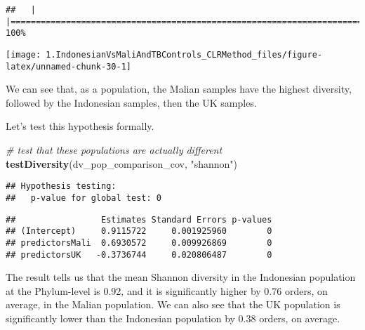 \documentclass[]{article}
\newenvironment{Shaded}{\begin{snugshade}}{\end{snugshade}}
\newcommand{\CommentTok}[1]{\textcolor[rgb]{0.56,0.35,0.01}{\textit{#1}}}
\newcommand{\DataTypeTok}[1]{\textcolor[rgb]{0.13,0.29,0.53}{#1}}
\newcommand{\KeywordTok}[1]{\textcolor[rgb]{0.13,0.29,0.53}{\textbf{#1}}}
\newcommand{\NormalTok}[1]{#1}
\newcommand{\OperatorTok}[1]{\textcolor[rgb]{0.81,0.36,0.00}{\textbf{#1}}}
\newcommand{\StringTok}[1]{\textcolor[rgb]{0.31,0.60,0.02}{#1}}
\begin{document}
\begin{verbatim}
##   |                                                                              |======================================================================| 100%
\end{verbatim}

\begin{Shaded}
\end{Shaded}

\begin{center}\texttt{[image: 1.IndonesianVsMaliAndTBControls\_CLRMethod\_files/figure-latex/unnamed-chunk-30-1]} \end{center}

We can see that, as a population, the Malian samples have the highest
diversity, followed by the Indonesian samples, then the UK samples.

Let's test this hypothesis formally.

\begin{Shaded}
\begin{Highlighting}[]
\CommentTok{# test that these populations are actually different}
\KeywordTok{testDiversity}\NormalTok{(dv_pop_comparison_cov, }\StringTok{"shannon"}\NormalTok{)}
\end{Highlighting}
\end{Shaded}

\begin{verbatim}
## Hypothesis testing:
##   p-value for global test: 0
\end{verbatim}

\begin{verbatim}
##                 Estimates Standard Errors p-values
## (Intercept)     0.9115722     0.001925960        0
## predictorsMali  0.6930572     0.009926869        0
## predictorsUK   -0.3736744     0.020806487        0
\end{verbatim}

The result tells us that the mean Shannon diversity in the Indonesian
population at the Phylum-level is 0.92, and it is significantly higher
by 0.76 orders, on average, in the Malian population. We can also see
that the UK population is significantly lower than the Indonesian
population by 0.38 orders, on average.
\end{document}
